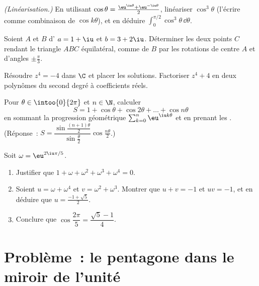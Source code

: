 \begin{exercise}[$\star\star$]\label{exo:g12:complex:6}
\emph{(Linéarisation.)} En utilisant
$\cos\theta = \frac{\eu^{\iu\theta} + \eu^{-\iu\theta}}{2}$, linéariser
$\cos^3\theta$ (l'écrire comme combinaison de $\cos k\theta$), et en déduire
$\displaystyle\int_0^{\pi/2}\cos^3\theta\,\dd\theta$.
\end{exercise}

\begin{exercise}[$\star\star$]\label{exo:g12:complex:7}
Soient $A$ et $B$ d' $a = 1 + \iu$ et $b = 3 + 2\iu$. Déterminer les
deux points $C$ rendant le triangle $ABC$ équilatéral, comme  de $B$
par les rotations de centre $A$ et d'angles $\pm\frac{\pi}{3}$.
\end{exercise}

\begin{exercise}[$\star\star\star$]\label{exo:g12:complex:8}
Résoudre $z^4 = -4$ dans $\C$ et placer les solutions. Factoriser
$z^4 + 4$ en deux polynômes du second degré à coefficients réels.
\end{exercise}

\begin{exercise}[$\star\star\star$]\label{exo:g12:complex:9}
Pour $\theta \in \intoo{0}{2\pi}$ et $n \in \N$, calculer
\[
S = 1 + \cos\theta + \cos 2\theta + \dots + \cos n\theta
\]
en sommant la progression géométrique
$\sum_{k=0}^n \eu^{\iu k\theta}$ et en prenant les .
(Réponse~:
$S = \dfrac{\sin\frac{(n+1)\theta}{2}}{\sin\frac{\theta}{2}}
\cos\frac{n\theta}{2}$.)
\end{exercise}

\begin{exercise}[$\star\star\star$]\label{exo:g12:complex:10}
Soit $\omega = \eu^{2\iu\pi/5}$.
\begin{enumerate}
  \item Justifier que $1 + \omega + \omega^2 + \omega^3 + \omega^4 = 0$.
  \item Soient $u = \omega + \omega^4$ et $v = \omega^2 + \omega^3$. Montrer
        que $u + v = -1$ et $uv = -1$, et en déduire que
        $u = \frac{-1+\sqrt5}{2}$.
  \item Conclure que $\cos\dfrac{2\pi}{5} = \dfrac{\sqrt5 - 1}{4}$.
\end{enumerate}
\end{exercise}

\section{Problème~: le pentagone dans le miroir de l'unité}

